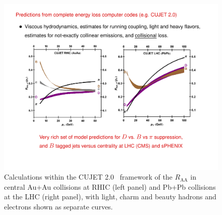 \begin{figure}[!hbt]
 \begin{center} \includegraphics[width=0.95\linewidth]{figs/CUJET_flavor_RAA_RHIC_LHC} 
   \caption[CUJET calculations of $R_\mathrm{AA}$ in central \auau
   collisions at RHIC and in Pb+Pb collisions at the LHC, with light,
   charm and beauty hadrons and electrons shown as separate
   curves.]{Calculations within the CUJET 2.0~\cite{Xu:2014ica}
     framework of the $R_\mathrm{AA}$ in central Au+Au collisions at
     RHIC (left panel) and Pb+Pb collisions at the LHC (right panel),
     with light, charm and beauty hadrons and electrons shown as
     separate curves.  }
  \label{fig:cujet}
 \end{center}
\end{figure}


